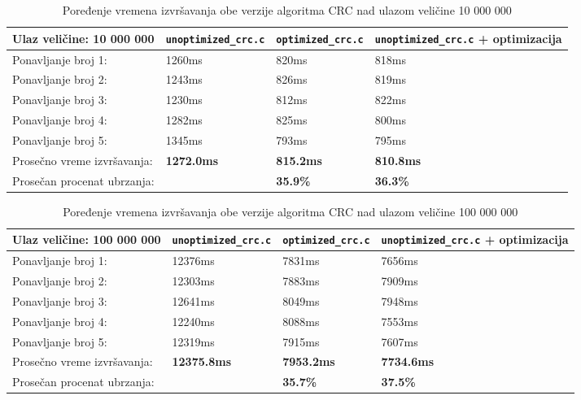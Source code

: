 \documentclass[12pt,oneside]{memoir}
\begin{document}
\begin{table}[!ht]
\begin{center}
\begin{tabular}{| m{5.5cm} | m{2.5cm}| m{2.5cm} | m{2.5cm} | }
      \hline
     Ulaz veličine: 10 000 000 & \texttt{unoptimized}\-\texttt{\_crc.c} & \texttt{optimized}\-\texttt{\_crc.c} & \texttt{unoptimized}\-\texttt{\_crc.c} + optimizacija\\ 
      \hline
      Ponavljanje broj 1: & 1260ms & 820ms & 818ms\\
      \hline
      Ponavljanje broj 2: & 1243ms & 826ms & 819ms\\
      \hline
      Ponavljanje broj 3: & 1230ms & 812ms & 822ms\\
      \hline
      Ponavljanje broj 4: & 1282ms & 825ms & 800ms\\
      \hline
      Ponavljanje broj 5: & 1345ms & 793ms & 795ms\\
      \hline
      Prosečno vreme izvršavanja: & \textbf{1272.0ms} & \textbf{815.2ms} & \textbf{810.8ms} \\
      \hline
      Prosečan procenat ubrzanja: & & \textbf{35.9\%} & \textbf{36.3\%}\\
      \hline
\end{tabular}
\end{center}
\caption{Poređenje vremena izvršavanja obe verzije algoritma CRC nad ulazom veličine 10 000 000}
\label{table_10m}
\end{table}

\begin{table}[!ht]
\begin{center}
\begin{tabular}{| m{5.5cm} | m{2.5cm}| m{2.5cm} | m{2.5cm} | }
      \hline
     Ulaz veličine: 100 000 000 & \texttt{unoptimized}\-\texttt{\_crc.c} & \texttt{optimized}\-\texttt{\_crc.c} & \texttt{unoptimized}\-\texttt{\_crc.c} + optimizacija\\ 
      \hline
      Ponavljanje broj 1: & 12376ms & 7831ms & 7656ms\\
      \hline
      Ponavljanje broj 2: & 12303ms & 7883ms & 7909ms\\
      \hline
      Ponavljanje broj 3: & 12641ms & 8049ms & 7948ms\\
      \hline
      Ponavljanje broj 4: & 12240ms & 8088ms & 7553ms\\
      \hline
      Ponavljanje broj 5: & 12319ms & 7915ms & 7607ms\\
      \hline
      Prosečno vreme izvršavanja: & \textbf{12375.8ms} & \textbf{7953.2ms} & \textbf{7734.6ms}\\
      \hline
      Prosečan procenat ubrzanja: & & \textbf{35.7\%} & \textbf{37.5\%}\\
      \hline
\end{tabular}
\end{center}
\caption{Poređenje vremena izvršavanja obe verzije algoritma CRC nad ulazom veličine 100 000 000}
\label{table_100m}
\end{table}
\end{document}

